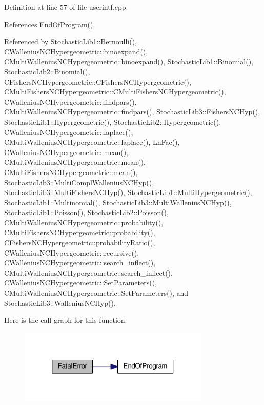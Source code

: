 Definition at line 57 of file userintf.\-cpp.



References End\-Of\-Program().



Referenced by Stochastic\-Lib1\-::\-Bernoulli(), C\-Wallenius\-N\-C\-Hypergeometric\-::binoexpand(), C\-Multi\-Wallenius\-N\-C\-Hypergeometric\-::binoexpand(), Stochastic\-Lib1\-::\-Binomial(), Stochastic\-Lib2\-::\-Binomial(), C\-Fishers\-N\-C\-Hypergeometric\-::\-C\-Fishers\-N\-C\-Hypergeometric(), C\-Multi\-Fishers\-N\-C\-Hypergeometric\-::\-C\-Multi\-Fishers\-N\-C\-Hypergeometric(), C\-Wallenius\-N\-C\-Hypergeometric\-::findpars(), C\-Multi\-Wallenius\-N\-C\-Hypergeometric\-::findpars(), Stochastic\-Lib3\-::\-Fishers\-N\-C\-Hyp(), Stochastic\-Lib1\-::\-Hypergeometric(), Stochastic\-Lib2\-::\-Hypergeometric(), C\-Wallenius\-N\-C\-Hypergeometric\-::laplace(), C\-Multi\-Wallenius\-N\-C\-Hypergeometric\-::laplace(), Ln\-Fac(), C\-Wallenius\-N\-C\-Hypergeometric\-::mean(), C\-Multi\-Wallenius\-N\-C\-Hypergeometric\-::mean(), C\-Multi\-Fishers\-N\-C\-Hypergeometric\-::mean(), Stochastic\-Lib3\-::\-Multi\-Compl\-Wallenius\-N\-C\-Hyp(), Stochastic\-Lib3\-::\-Multi\-Fishers\-N\-C\-Hyp(), Stochastic\-Lib1\-::\-Multi\-Hypergeometric(), Stochastic\-Lib1\-::\-Multinomial(), Stochastic\-Lib3\-::\-Multi\-Wallenius\-N\-C\-Hyp(), Stochastic\-Lib1\-::\-Poisson(), Stochastic\-Lib2\-::\-Poisson(), C\-Multi\-Wallenius\-N\-C\-Hypergeometric\-::probability(), C\-Multi\-Fishers\-N\-C\-Hypergeometric\-::probability(), C\-Fishers\-N\-C\-Hypergeometric\-::probability\-Ratio(), C\-Wallenius\-N\-C\-Hypergeometric\-::recursive(), C\-Wallenius\-N\-C\-Hypergeometric\-::search\-\_\-inflect(), C\-Multi\-Wallenius\-N\-C\-Hypergeometric\-::search\-\_\-inflect(), C\-Wallenius\-N\-C\-Hypergeometric\-::\-Set\-Parameters(), C\-Multi\-Wallenius\-N\-C\-Hypergeometric\-::\-Set\-Parameters(), and Stochastic\-Lib3\-::\-Wallenius\-N\-C\-Hyp().



Here is the call graph for this function\-:\nopagebreak
\begin{figure}[H]
\begin{center}
\leavevmode
\includegraphics[width=258pt]{toolboxes_2rnd_2userintf_8cpp_a286fff8437e15b1a6ba210f84af9fce0_cgraph}
\end{center}
\end{figure}




